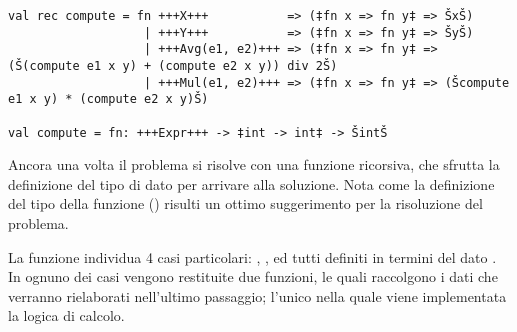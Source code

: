 \begin{lstlisting}[style = SML, caption = {Definizione della funzione \sml{compute}}]
val rec compute = fn +++X+++           => (‡fn x => fn y‡ => ŠxŠ)
				   | +++Y+++           => (‡fn x => fn y‡ => ŠyŠ)
				   | +++Avg(e1, e2)+++ => (‡fn x => fn y‡ => (Š(compute e1 x y) + (compute e2 x y)) div 2Š)
				   | +++Mul(e1, e2)+++ => (‡fn x => fn y‡ => (Šcompute e1 x y) * (compute e2 x y)Š)

val compute = fn: +++Expr+++ -> ‡int -> int‡ -> ŠintŠ
\end{lstlisting}

Ancora una volta il problema si risolve con una funzione ricorsiva, che sfrutta la definizione del tipo di dato  per arrivare alla soluzione. %
Nota come la definizione del tipo della funzione () risulti un ottimo suggerimento per la risoluzione del problema.

La funzione individua 4 casi particolari: , ,  ed  tutti definiti in termini del dato . %
In ognuno dei casi vengono restituite due funzioni, le quali raccolgono i dati che verranno rielaborati nell'ultimo passaggio; %
l'unico nella quale viene implementata la logica di calcolo.
